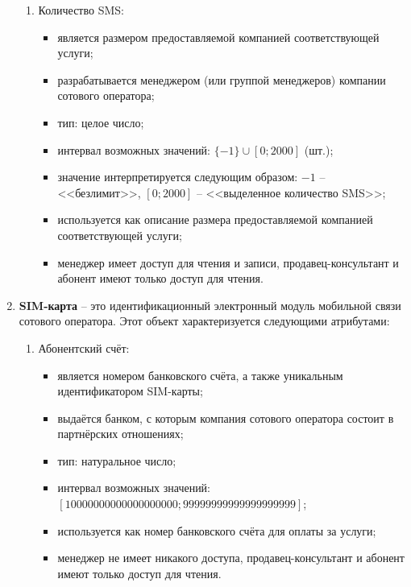 \begin{enumerate}
\begin{enumerate}
        \item Количество SMS:
        \begin{itemize}
            \item является размером предоставляемой компанией соответствующей услуги;
            \item разрабатывается менеджером (или группой менеджеров) компании сотового оператора;
            \item тип: целое число;
            \item интервал возможных значений: $\{-1\} \cup [0; 2 000]$ (шт.); %
            \item значение интерпретируется следующим образом: $-1$ -- <<безлимит>>, $[0; 2 000]$ -- <<выделенное количество SMS>>;
            \item используется как описание размера предоставляемой компанией соответствующей услуги;
            \item менеджер имеет доступ для чтения и записи, продавец-консультант и абонент имеют только доступ для чтения.
        \end{itemize}
    \end{enumerate}

    \item \textbf{SIM-карта} -- это идентификационный электронный модуль мобильной связи сотового оператора. Этот объект характеризуется следующими атрибутами:
    \begin{enumerate}
        \item Абонентский счёт:
        \begin{itemize}
            \item является номером банковского счёта, а также уникальным идентификатором SIM-карты;
            \item выдаётся банком, с которым компания сотового оператора состоит в партнёрских отношениях;
            \item тип: натуральное число;
            \item интервал возможных значений: $[10 000 000 000 000 000 000; 99 999 999 999 999 999 999]$;
            \item используется как номер банковского счёта для оплаты за услуги;
            \item менеджер не имеет никакого доступа, продавец-консультант и абонент имеют только доступ для чтения.
        \end{itemize}


\end{enumerate}
\end{enumerate}
